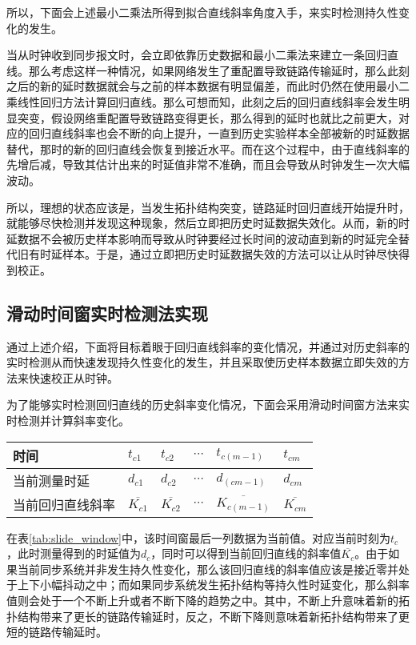 所以，下面会上述最小二乘法所得到拟合直线斜率角度入手，来实时检测持久性变化的发生。

当从时钟收到同步报文时，会立即依靠历史数据和最小二乘法来建立一条回归直线。那么考虑这样一种情况，如果网络发生了重配置导致链路传输延时，那么此刻之后的新的延时数据就会与之前的样本数据有明显偏差，而此时仍然在使用最小二乘线性回归方法计算回归直线。那么可想而知，此刻之后的回归直线斜率会发生明显突变，假设网络重配置导致链路变得更长，那么得到的延时也就比之前更大，对应的回归直线斜率也会不断的向上提升，一直到历史实验样本全部被新的时延数据替代，那时的新的回归直线会恢复到接近水平。而在这个过程中，由于直线斜率的先增后减，导致其估计出来的时延值非常不准确，而且会导致从时钟发生一次大幅波动。

所以，理想的状态应该是，当发生拓扑结构突变，链路延时回归直线开始提升时，就能够尽快检测并发现这种现象，然后立即把历史时延数据失效化。从而，新的时延数据不会被历史样本影响而导致从时钟要经过长时间的波动直到新的时延完全替代旧有时延样本。于是，通过立即把历史时延数据失效的方法可以让从时钟尽快得到校正。

\subsection{滑动时间窗实时检测法实现}
通过上述介绍，下面将目标着眼于回归直线斜率的变化情况，并通过对历史斜率的实时检测从而快速发现持久性变化的发生，并且采取使历史样本数据立即失效的方法来快速校正从时钟。

为了能够实时检测回归直线的历史斜率变化情况，下面会采用滑动时间窗方法来实时检测并计算斜率变化。
\begin{table}[!hpb]
  \centering
  \begin{tabular}{llllll} \toprule
  	时间 & $t_{c1}$ & $t_{c2}$ & $\cdots$ & $t_{c(m-1)}$ & $t_{cm}$ \\ \midrule
    当前测量时延 & $d_{c1}$ & $d_{c2}$ & $\cdots$ & $d_{(cm-1)}$ & $d_{cm}$ \\ \midrule
    当前回归直线斜率 & $\overline{K_{c1}}$ & $\overline{K_{c2}}$ & $\cdots$ & $\overline{K_{c(m-1)}}$ & $\overline{K_{cm}}$  \\ \bottomrule
  \end{tabular}
\end{table}

在表\ref{tab:slide_window}中，该时间窗最后一列数据为当前值。对应当前时刻为$t_{c}$，此时测量得到的时延值为$d_{c}$，同时可以得到当前回归直线的斜率值$\overline{K_{c}}$。由于如果当前同步系统并非发生持久性变化，那么该回归直线的斜率值应该是接近零并处于上下小幅抖动之中；而如果同步系统发生拓扑结构等持久性时延变化，那么斜率值则会处于一个不断上升或者不断下降的趋势之中。其中，不断上升意味着新的拓扑结构带来了更长的链路传输延时，反之，不断下降则意味着新拓扑结构带来了更短的链路传输延时。

